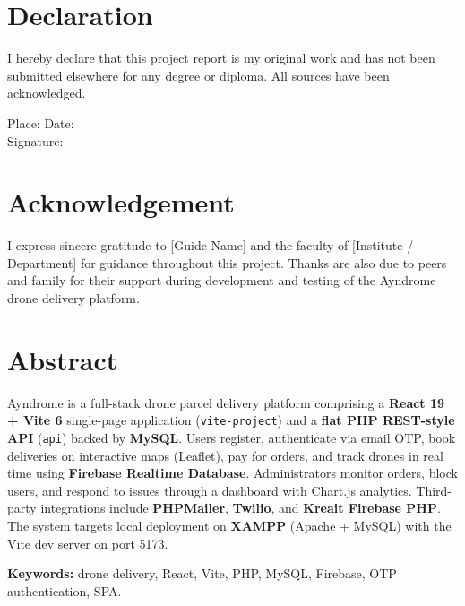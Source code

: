 \documentclass[12pt,a4paper,oneside]{report}
\newcommand{\studentname}{[Student Name]}
\newcommand{\guide}{[Guide Name]}
\newcommand{\institute}{[Institute / Department]}
\begin{document}
\chapter*{Declaration}
I hereby declare that this project report is my original work and has not been submitted
elsewhere for any degree or diploma. All sources have been acknowledged.

\vspace{1.5cm}
\noindent Place: \underline{\hspace{4cm}} \hfill Date: \underline{\hspace{3cm}}\\
\noindent Signature: \underline{\hspace{5cm}}\\
\noindent \studentname

\chapter*{Acknowledgement}
I express sincere gratitude to \guide{} and the faculty of \institute{} for guidance
throughout this project. Thanks are also due to peers and family for their support during
development and testing of the Ayndrome drone delivery platform.

\chapter*{Abstract}
Ayndrome is a full-stack drone parcel delivery platform comprising a \textbf{React 19 + Vite 6}
single-page application (\texttt{vite-project}) and a \textbf{flat PHP REST-style API}
(\texttt{api}) backed by \textbf{MySQL}. Users register, authenticate via email OTP, book
deliveries on interactive maps (Leaflet), pay for orders, and track drones in real time using
\textbf{Firebase Realtime Database}. Administrators monitor orders, block users, and respond to
issues through a dashboard with Chart.js analytics. Third-party integrations include
\textbf{PHPMailer}, \textbf{Twilio}, and \textbf{Kreait Firebase PHP}. The system targets local
deployment on \textbf{XAMPP} (Apache + MySQL) with the Vite dev server on port 5173.

\textbf{Keywords:} drone delivery, React, Vite, PHP, MySQL, Firebase, OTP authentication, SPA.
\end{document}
